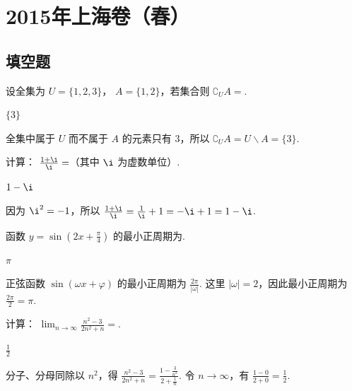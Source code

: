 \chapter{2015年上海卷（春）}

\section{填空题}

\begin{problem}
设全集为 \( U = \{1, 2, 3\} \)， \( A = \{1, 2\} \)，若集合则 \( \complement_U A = \)\fillinblank{}.

\begin{answer}
\(\{3\}\)
\end{answer}

\begin{solution}
全集中属于 \(U\) 而不属于 \(A\) 的元素只有 \(3\)，所以 \(\complement_U A=U\mathbin{\backslash} A=\{3\}\).
\end{solution}
\end{problem}

\begin{problem}
计算： \( \frac{1 + \i}{\i} = \)\fillinblank{}（其中 \( \i \) 为虚数单位）.

\begin{answer}
\(1-\i\)
\end{answer}

\begin{solution}
因为 \(\i^2=-1\)，所以 \(\frac{1+\i}{\i}=\frac{1}{\i}+1=-\i+1=1-\i\).
\end{solution}
\end{problem}

\begin{problem}
函数 \( y = \sin\left(2x + \frac{\pi}{4}\right) \) 的最小正周期为\fillinblank{}.

\begin{answer}
\(\pi\)
\end{answer}

\begin{solution}
正弦函数 \(\sin(\omega x+\varphi)\) 的最小正周期为 \(\frac{2\pi}{|\omega|}\). 这里 \(|\omega|=2\)，因此最小正周期为 \(\frac{2\pi}{2}=\pi\).
\end{solution}
\end{problem}

\begin{problem}
计算： \( \displaystyle\lim_{n \to \infty} \frac{n^2 - 3}{2n^2 + n} = \)\fillinblank{}.

\begin{answer}
\(\frac{1}{2}\)
\end{answer}

\begin{solution}
分子、分母同除以 \(n^2\)，得 \(\frac{n^2-3}{2n^2+n}=\frac{1-\frac{3}{n^2}}{2+\frac{1}{n}}\). 令 \(n\to\infty\)，有 \(\frac{1-0}{2+0}=\frac12\).
\end{solution}
\end{problem}

